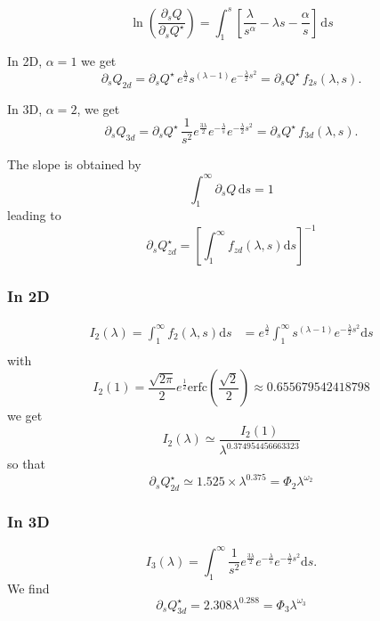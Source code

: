 \documentclass[11pt]{revtex4}
\begin{document}
\begin{equation}
	\ln \left(\dfrac{\partial_s Q}{\partial_sQ^\star}\right) = \int_1^s \left[\dfrac{\lambda}{s^\alpha} - \lambda s -\dfrac{\alpha}{s}\right] \,\mathrm{d}s
\end{equation}

In 2D, $\alpha=1$ we get
\begin{equation}
	\label{eq:dsQ2d}
	\partial_s Q_{2d} = \partial_s Q^\star \, e^{\frac{\lambda}{2}}s^{(\lambda-1)}e^{-\frac{\lambda}{2}s^2} = \partial_s Q^\star \, f_{2s}(\lambda,s).
\end{equation}

In 3D, $\alpha=2$, we get
\begin{equation}
	\label{eq:dsQ3d}
	\partial_s Q_{3d} = \partial_s Q^\star \, \dfrac{1}{s^2} e^{\frac{3\lambda}{2}} e^{-\frac{\lambda}{s}} e^{-\frac{\lambda}{2}s^2} = \partial_s Q^\star \, f_{3d}(\lambda,s).
\end{equation}

The slope is obtained by
$$
	\int_1^\infty \partial_s Q \, \mathrm{d} s = 1
$$
leading to
\begin{equation}
	\partial_sQ^\star_{zd} = \left[ \int_1^\infty f_{zd}(\lambda,s) \mathrm{d}s \right] ^{-1}
\end{equation}

\subsubsection{In 2D}
\begin{equation}
	\begin{array}{rl}
	I_2(\lambda) = \int_1^\infty f_2(\lambda,s) \mathrm{d}s & =  e^{\frac{\lambda}{2}}\int_1^\infty s^{(\lambda-1)}e^{-\frac{\lambda}{2}s^2 } \mathrm{d}s\\
	\end{array}
\end{equation}
with 
$$
	I_2(1) = \dfrac{\sqrt{2\pi}}{2} e^{\frac{1}{2}} \mathrm{erfc}
	\left(\dfrac{\sqrt{2}}{2}\right) \approx 0.655679542418798
$$
we get 
$$
	I_2(\lambda) \simeq \dfrac{I_2(1)}{\lambda^{0.374954456663323}}
$$
so that
\begin{equation}
	\partial_s Q^\star_{2d} \simeq 1.525 \times \lambda^{0.375} = \Phi_2 \lambda^{\omega_2}
\end{equation}


\subsubsection{In 3D}
\begin{equation}
	I_3(\lambda) = \int_1^\infty \dfrac{1}{s^2} e^{\frac{3\lambda}{2}} e^{-\frac{\lambda}{s}} e^{-\frac{\lambda}{2}s^2} \mathrm{d}s.
\end{equation}
We find
\begin{equation}
	\partial_s Q^\star_{3d} = 2.308 \lambda^{0.288} = \Phi_3 \lambda ^ {\omega_3}
\end{equation}
\end{document}
